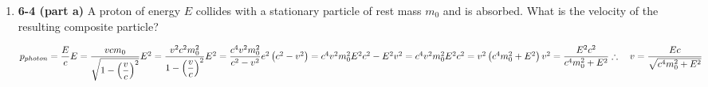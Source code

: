 \documentclass[fleqn]{article}
\begin{document}
  \begin{enumerate}
    \item \textbf{6-4 (part a)} A proton of energy $E$ collides with a stationary particle of rest 
    mass $m_0$ and is absorbed. What is the velocity of the resulting composite particle?

      \textcolor{hwColor}{
        $
          p_{photon}=\dfrac{E}{c}
          \\
          \\
          \\
          E=\dfrac{v c m_0}{\sqrt{1-\left(\dfrac{v}{c}\right)^2}}
          \\
          \\
          \\
          E^2=\dfrac{v^2 c^2 m_0^2}{1-\left(\dfrac{v}{c}\right)^2}
          \\
          \\
          \\
          E^2=\dfrac{c^4 v^2 m_0^2}{c^2-v^2}
          \\
          \\
          \\
          e^2 \left(c^2-v^2\right)=c^4 v^2 m_0^2
          \\
          \\
          \\
          E^2 c^2-E^2 v^2=c^4 v^2 m_0^2
          \\
          \\
          \\
          E^2 c^2 =v^2 \left(c^4 m_0^2+E^2\right)
          \\
          \\
          \\
          v^2=\dfrac{E^2 c^2}{c^4 m_0^2+E^2}
          \\
          \\
          \\
          \therefore ~~~ v=\dfrac{Ec}{\sqrt{c^4 m_0^2+E^2}}
        $
      }

  \end{enumerate}
\end{document}

